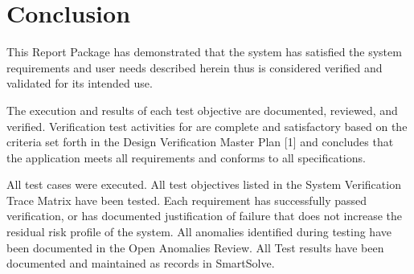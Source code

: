 \newpage
\section{Conclusion}
This Report Package has demonstrated that the \vssShort system has satisfied
the system requirements and user needs described herein thus is considered 
verified and validated for its intended use.

The execution and results of each test objective are documented, reviewed, and 
verified. Verification test activities for \vssLong are complete and 
satisfactory based on the criteria set forth in the Design 
Verification Master Plan [1] and concludes that the \vssShort application 
meets all requirements and conforms to all specifications.

All test cases were executed.
All test objectives listed in the System Verification Trace Matrix
have been tested.
Each requirement has successfully passed verification, or has documented 
justification of failure that does not increase the residual risk profile of 
the system.
All anomalies identified during testing have been documented in the Open 
Anomalies Review.
All Test results have been documented and maintained as records in SmartSolve.

